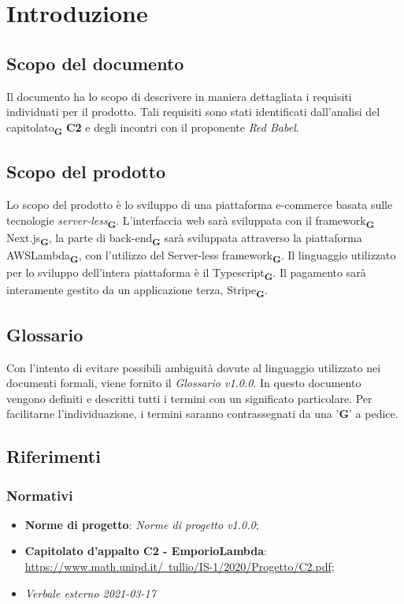 \section{Introduzione}
    \subsection{Scopo del documento}
    Il documento ha lo scopo di descrivere in maniera dettagliata i requisiti individuati per il prodotto. Tali requisiti sono stati identificati dall'analisi del capitolato\textsubscript{\textbf{G}} \textbf{C2} e degli incontri con il proponente \textit{Red Babel}.
    \subsection{Scopo del prodotto}
    Lo scopo del prodotto è lo sviluppo di una piattaforma e-commerce basata sulle tecnologie \textit{server-less}\textsubscript{\textbf{G}}. L'interfaccia web sarà sviluppata con il framework\textsubscript{\textbf{G}} Next.js\textsubscript{\textbf{G}}, la parte di back-end\textsubscript{\textbf{G}} sarà sviluppata attraverso la piattaforma AWSLambda\textsubscript{\textbf{G}}, con l'utilizzo del Server-less framework\textsubscript{\textbf{G}}. Il linguaggio utilizzato per lo sviluppo dell'intera piattaforma è il Typescript\textsubscript{\textbf{G}}. Il pagamento sarà interamente gestito da un applicazione terza, Stripe\textsubscript{\textbf{G}}.
    \subsection{Glossario}
    Con l'intento di evitare possibili ambiguità dovute al linguaggio utilizzato nei documenti formali, viene fornito il \textit{Glossario v1.0.0}. In questo documento vengono definiti e descritti tutti i termini con un significato particolare. Per facilitarne l'individuazione, i termini saranno contrassegnati da una '\textbf{G}' a pedice.
    \subsection{Riferimenti}
    \subsubsection{Normativi}
    \begin{itemize}
        \item \textbf{Norme di progetto}: \textit{Norme di progetto v1.0.0};
        \item \textbf{Capitolato d'appalto C2 - EmporioLambda}:\\ \href{https://www.math.unipd.it/~tullio/IS-1/2020/Progetto/C2.pdf}{https://www.math.unipd.it/~tullio/IS-1/2020/Progetto/C2.pdf};
        \item \textit{Verbale esterno 2021-03-17}
    \end{itemize}
